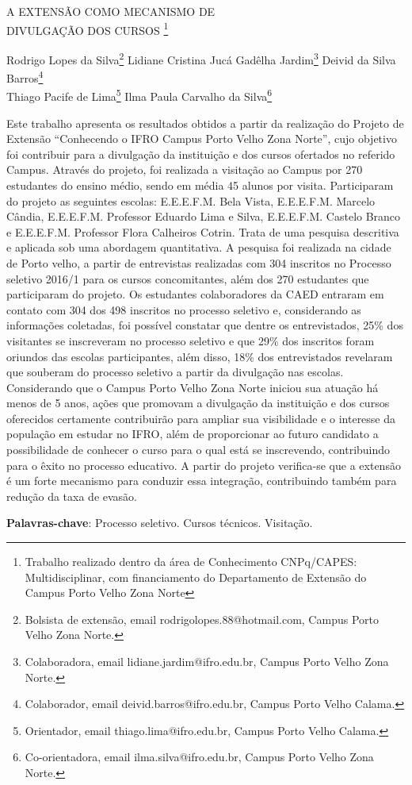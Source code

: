 \documentclass[article,12pt,onesidea,4paper,english,brazil]{abntex2}
\begin{document}
	
	
	\frenchspacing 
	
	\begin{center}
		\LARGE A EXTENSÃO COMO MECANISMO DE \\DIVULGAÇÃO DOS CURSOS \footnote{Trabalho realizado dentro da área de Conhecimento CNPq/CAPES: Multidisciplinar, com financiamento do Departamento de Extensão do Campus Porto Velho Zona Norte}
		
		\normalsize
		Rodrigo Lopes da Silva\footnote{Bolsista de extensão, email rodrigolopes.88@hotmail.com, Campus Porto Velho Zona Norte.} 
		Lidiane Cristina Jucá Gadêlha Jardim\footnote{Colaboradora, email  lidiane.jardim@ifro.edu.br, Campus Porto Velho Zona Norte.} 
		Deivid da Silva Barros\footnote{Colaborador, email  deivid.barros@ifro.edu.br, Campus Porto Velho Calama.} \\
		Thiago Pacife de Lima\footnote{Orientador, email thiago.lima@ifro.edu.br, Campus Porto Velho Calama.} 
		Ilma Paula Carvalho da Silva\footnote{Co-orientadora, email ilma.silva@ifro.edu.br, Campus Porto Velho Zona Norte.}
	\end{center}
	
	\noindent Este trabalho apresenta os resultados obtidos a partir da realização do Projeto de Extensão “Conhecendo o IFRO Campus Porto Velho Zona Norte”, cujo objetivo foi contribuir para a divulgação da instituição e dos cursos ofertados no referido Campus. Através do projeto, foi realizada a visitação ao Campus por 270 estudantes do ensino médio, sendo em média 45 alunos por visita. Participaram do projeto as seguintes escolas: E.E.E.F.M. Bela Vista, E.E.E.F.M. Marcelo Cândia, E.E.E.F.M.  Professor Eduardo Lima e Silva, E.E.E.F.M.  Castelo Branco e E.E.E.F.M.  Professor Flora Calheiros Cotrin. Trata de uma pesquisa descritiva e aplicada sob uma abordagem quantitativa. A pesquisa foi realizada na cidade de Porto velho, a partir de entrevistas realizadas com 304 inscritos no Processo seletivo 2016/1 para os cursos concomitantes, além dos 270 estudantes que participaram do projeto. Os estudantes colaboradores da CAED entraram em contato com 304 dos 498 inscritos no processo seletivo e, considerando as informações coletadas, foi possível constatar que dentre os entrevistados, 25\% dos visitantes se inscreveram no processo seletivo e que 29\% dos inscritos foram oriundos das escolas participantes, além disso, 18\% dos entrevistados revelaram que souberam do processo seletivo a partir da divulgação nas escolas. Considerando que o Campus Porto Velho Zona Norte iniciou sua atuação há menos de 5 anos, ações que promovam a divulgação da instituição e dos cursos oferecidos certamente contribuirão para ampliar sua visibilidade e o interesse da população em estudar no IFRO, além de proporcionar ao futuro candidato a possibilidade de conhecer o curso para o qual está se inscrevendo, contribuindo para o êxito no processo educativo. A partir do projeto verifica-se que a extensão é um forte mecanismo para conduzir essa integração, contribuindo também para redução da taxa de evasão.
	
	\vspace{\onelineskip}
	
	\noindent
	\textbf{Palavras-chave}: Processo seletivo. Cursos técnicos. Visitação.
	
\end{document}
